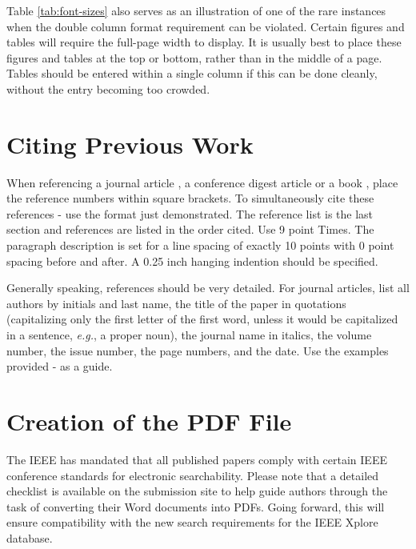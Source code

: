\documentclass[10pt,conference,letterpaper]{RWWTemplate}
\begin{document}
Table \ref{tab:font-sizes} also serves as an illustration of one of the rare instances when the double column format requirement can be violated. Certain figures and tables will require the full-page width to display. It is usually best to place these figures and tables at the top or bottom, rather than in the middle of a page. Tables should be entered within a single column if this can be done cleanly, without the entry becoming too crowded.

\section{Citing Previous Work}
When referencing a journal article \cite{RWWExample:Cantrell}, a
conference digest article \cite{RWWExample:Cantrell2} or a book
\cite{RWWExample:book}, place the reference numbers within square
brackets. To simultaneously cite these references
\cite{RWWExample:Cantrell}-\cite{RWWExample:book} use the
format just demonstrated. The reference list is the last section and
references are listed in the order cited. Use 9 point Times. The
paragraph description is set for a line spacing of exactly 10 points
with 0 point spacing before and after. A 0.25 inch hanging indention
should be specified.

Generally speaking, references should be very detailed. For journal
articles, list all authors by initials and last name, the title of the
paper in quotations (capitalizing only the first letter of the first
word, unless it would be capitalized in a sentence, {\it e.g.}, a proper
noun), the journal name in italics, the volume number, the issue
number, the page numbers, and the date. Use the examples provided
\cite{RWWExample:Cantrell}-\cite{RWWExample:book} as a guide.

\section{Creation of the PDF File}
The IEEE has mandated that all published papers comply with certain IEEE conference standards for electronic searchability. Please note that a detailed checklist is available on the submission site to help guide authors through the task of converting their Word documents into PDFs. Going forward, this will ensure compatibility with the new search requirements for the IEEE Xplore database.
\end{document}
